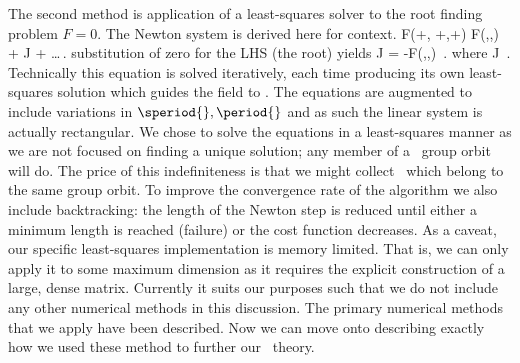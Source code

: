 The second method is application of a least-squares solver
to the root finding problem $F=0$. The Newton system is
derived here for context.
\beq
F(\Fu+\delta\Fu, \speriod{}+\delta\speriod{},\period{}+\delta \period{})\approx
F(\Fu,\speriod{},\period{}) + J \cdot [\delta\Fu, \delta \speriod{}, \delta \period{}] + \dots \,.
\eeq
substitution of zero for the LHS (the root) yields
\beq \label{newton}
J \cdot [\delta\Fu, \delta \speriod{}, \delta \period{}] = -F(\Fu,\speriod{},\period{}) \,.
\eeq
where
\beq
J \equiv {} \,.
\eeq
Technically this equation is solved iteratively, each time producing its own least-squares solution which guides the field to \twot.
The equations are augmented to include variations in $\speriod{},\period{}$ and as
such the linear system is actually rectangular.
We chose to solve the equations in a least-squares manner as we are not focused on finding a unique
solution; any member of a \twots\ group orbit will do. The price of this indefiniteness is that we might
collect \twots\ which belong to the same group orbit. To improve the convergence rate of the algorithm we also include backtracking: the length of the Newton step is reduced until either a minimum length is reached (failure) or the cost function decreases.
As a caveat, our specific least-squares
implementation is memory limited. That is, we can only apply it to some maximum dimension as it requires
the explicit construction of a large, dense matrix. Currently it suits our purposes such that we do not include any other numerical methods in this discussion.
The primary numerical methods that we apply have been described.
Now we can move onto describing exactly
how we used these method to further our \spt\ theory.


